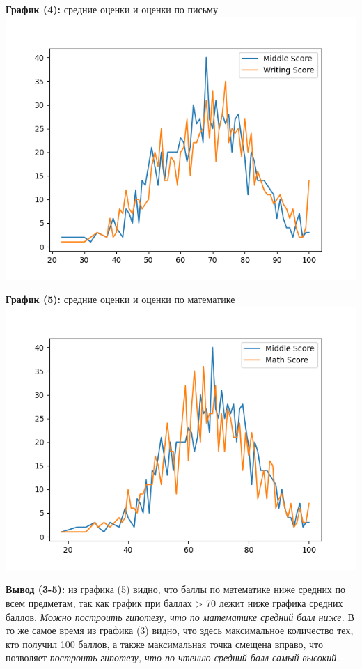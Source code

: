 \documentclass[12pt,a4paper]{article}
\begin{document}
\large \textbf{График (4):} средние оценки и оценки по письму\\
\includegraphics{middle_writing_score} 

\large \textbf{График (5):} средние оценки и оценки по математике\\
\includegraphics{middle_math_score} 

\large \textbf{Вывод (3-5):} из графика (5) видно, что баллы по математике ниже средних по всем предметам, так как график при баллах > 70 лежит ниже графика средних баллов. \textit{Можно построить гипотезу, что по математике средний балл ниже.}
В то же самое время из графика (3) видно, что здесь максимальное количество тех, кто получил 100 баллов, а также максимальная точка смещена вправо, что позволяет 
\textit{построить гипотезу, что по чтению средний балл самый высокий.}
\end{document}
